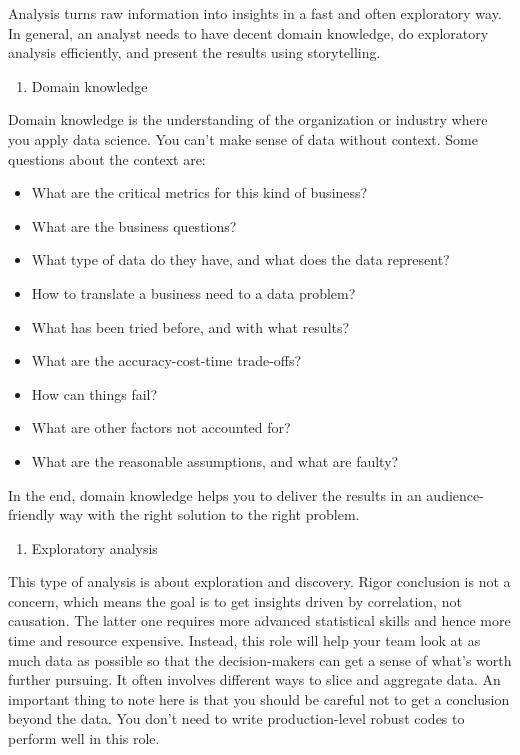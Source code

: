 \documentclass[
  12pt,
]{krantz}
\providecommand{\tightlist}{%
  \setlength{\itemsep}{0pt}\setlength{\parskip}{0pt}}
\begin{document}
Analysis turns raw information into insights in a fast and often exploratory way. In general, an analyst needs to have decent domain knowledge, do exploratory analysis efficiently, and present the results using storytelling.

\begin{enumerate}
\def\labelenumi{(\arabic{enumi})}
\tightlist
\item
  Domain knowledge
\end{enumerate}

Domain knowledge is the understanding of the organization or industry where you apply data science. You can't make sense of data without context. Some questions about the context are:

\begin{itemize}
\tightlist
\item
  What are the critical metrics for this kind of business?
\item
  What are the business questions?
\item
  What type of data do they have, and what does the data represent?
\item
  How to translate a business need to a data problem?
\item
  What has been tried before, and with what results?
\item
  What are the accuracy-cost-time trade-offs?
\item
  How can things fail?
\item
  What are other factors not accounted for?
\item
  What are the reasonable assumptions, and what are faulty?
\end{itemize}

In the end, domain knowledge helps you to deliver the results in an audience-friendly way with the right solution to the right problem.

\begin{enumerate}
\def\labelenumi{(\arabic{enumi})}
\setcounter{enumi}{1}
\tightlist
\item
  Exploratory analysis
\end{enumerate}

This type of analysis is about exploration and discovery. Rigor conclusion is not a concern, which means the goal is to get insights driven by correlation, not causation. The latter one requires more advanced statistical skills and hence more time and resource expensive. Instead, this role will help your team look at as much data as possible so that the decision-makers can get a sense of what's worth further pursuing. It often involves different ways to slice and aggregate data. An important thing to note here is that you should be careful not to get a conclusion beyond the data. You don't need to write production-level robust codes to perform well in this role.
\end{document}

